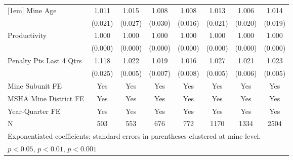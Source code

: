 {\begin{tabular}{l*{7}{c}}
[1em]
Mine Age                 &       1.011         &       1.015         &       1.008         &       1.008         &       1.013         &       1.006         &       1.014         \\
                         &     (0.021)         &     (0.027)         &     (0.030)         &     (0.016)         &     (0.021)         &     (0.020)         &     (0.019)         \\
[1em]
Productivity             &       1.000         &       1.000         &       1.000         &       1.000         &       1.000         &       1.000         &       1.000         \\
                         &     (0.000)         &     (0.000)         &     (0.000)         &     (0.000)         &     (0.000)         &     (0.000)         &     (0.000)         \\
[1em]
Penalty Pts Last 4 Qtrs  &       1.118\sym{***}&       1.022\sym{***}&       1.019\sym{**} &       1.016\sym{*}  &       1.027\sym{***}&       1.021\sym{***}&       1.023\sym{***}\\
                         &     (0.025)         &     (0.005)         &     (0.007)         &     (0.008)         &     (0.005)         &     (0.006)         &     (0.005)         \\
[1em]
Mine Subunit FE          &         Yes         &         Yes         &         Yes         &         Yes         &         Yes         &         Yes         &         Yes         \\
[1em]
MSHA Mine District FE    &         Yes         &         Yes         &         Yes         &         Yes         &         Yes         &         Yes         &         Yes         \\
[1em]
Year-Quarter FE          &         Yes         &         Yes         &         Yes         &         Yes         &         Yes         &         Yes         &         Yes         \\
\hline
N                        &         503         &         553         &         676         &         772         &        1170         &        1334         &        2504         \\
\hline\hline
\multicolumn{8}{l}{\footnotesize Exponentiated coefficients; standard errors in parentheses clustered at mine level.}\\
\multicolumn{8}{l}{\footnotesize \sym{*} \(p<0.05\), \sym{**} \(p<0.01\), \sym{***} \(p<0.001\)}\\
\end{tabular}
}
